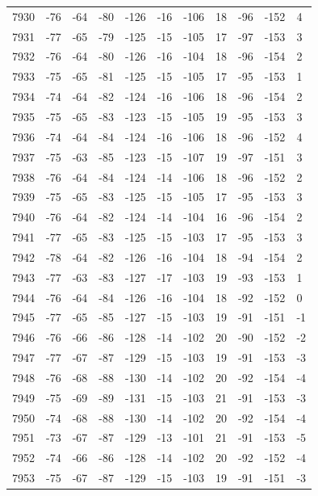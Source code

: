 \begin{table}[H]
\begin{tabular}{lllllllllll}
7930 & -76 & -64 & -80 & -126 & -16 & -106 & 18 & -96 & -152 & 4 \\
7931 & -77 & -65 & -79 & -125 & -15 & -105 & 17 & -97 & -153 & 3 \\
7932 & -76 & -64 & -80 & -126 & -16 & -104 & 18 & -96 & -154 & 2 \\
7933 & -75 & -65 & -81 & -125 & -15 & -105 & 17 & -95 & -153 & 1 \\
7934 & -74 & -64 & -82 & -124 & -16 & -106 & 18 & -96 & -154 & 2 \\
7935 & -75 & -65 & -83 & -123 & -15 & -105 & 19 & -95 & -153 & 3 \\
7936 & -74 & -64 & -84 & -124 & -16 & -106 & 18 & -96 & -152 & 4 \\
7937 & -75 & -63 & -85 & -123 & -15 & -107 & 19 & -97 & -151 & 3 \\
7938 & -76 & -64 & -84 & -124 & -14 & -106 & 18 & -96 & -152 & 2 \\
7939 & -75 & -65 & -83 & -125 & -15 & -105 & 17 & -95 & -153 & 3 \\
7940 & -76 & -64 & -82 & -124 & -14 & -104 & 16 & -96 & -154 & 2 \\
7941 & -77 & -65 & -83 & -125 & -15 & -103 & 17 & -95 & -153 & 3 \\
7942 & -78 & -64 & -82 & -126 & -16 & -104 & 18 & -94 & -154 & 2 \\
7943 & -77 & -63 & -83 & -127 & -17 & -103 & 19 & -93 & -153 & 1 \\
7944 & -76 & -64 & -84 & -126 & -16 & -104 & 18 & -92 & -152 & 0 \\
7945 & -77 & -65 & -85 & -127 & -15 & -103 & 19 & -91 & -151 & -1 \\
7946 & -76 & -66 & -86 & -128 & -14 & -102 & 20 & -90 & -152 & -2 \\
7947 & -77 & -67 & -87 & -129 & -15 & -103 & 19 & -91 & -153 & -3 \\
7948 & -76 & -68 & -88 & -130 & -14 & -102 & 20 & -92 & -154 & -4 \\
7949 & -75 & -69 & -89 & -131 & -15 & -103 & 21 & -91 & -153 & -3 \\
7950 & -74 & -68 & -88 & -130 & -14 & -102 & 20 & -92 & -154 & -4 \\
7951 & -73 & -67 & -87 & -129 & -13 & -101 & 21 & -91 & -153 & -5 \\
7952 & -74 & -66 & -86 & -128 & -14 & -102 & 20 & -92 & -152 & -4 \\
7953 & -75 & -67 & -87 & -129 & -15 & -103 & 19 & -91 & -151 & -3 \\

\end{tabular}
\end{table}
